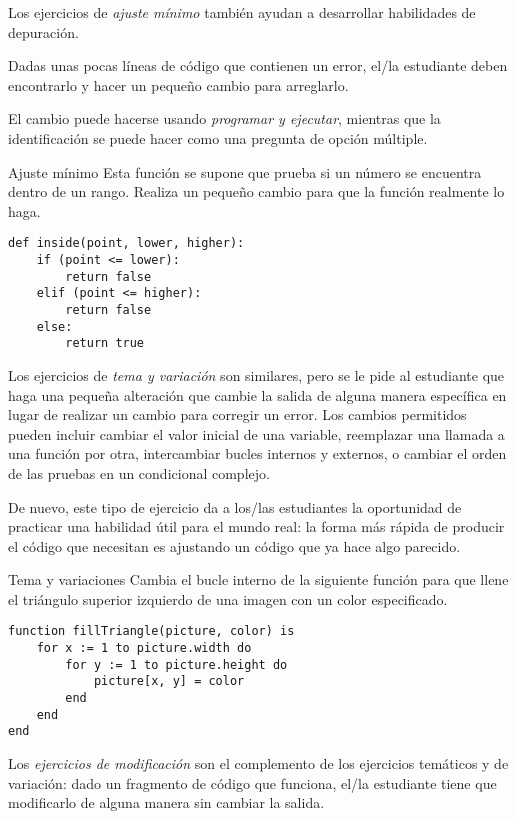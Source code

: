 Los ejercicios de \emph{ajuste mínimo} también ayudan a desarrollar habilidades de depuración.

Dadas unas pocas líneas de código que contienen un error, el/la estudiante deben encontrarlo y hacer un pequeño cambio para arreglarlo.

El cambio puede hacerse usando \emph{programar y ejecutar},
mientras que la identificación se puede hacer como una pregunta de opción múltiple.


\begin{aside}{Ajuste mínimo}
 Esta función se supone que prueba 
 si un número se encuentra dentro de un rango.
 Realiza un pequeño cambio para que la función realmente lo haga.

\begin{verbatim}
def inside(point, lower, higher):
    if (point <= lower):
        return false
    elif (point <= higher):
        return false
    else:
        return true
\end{verbatim}
\end{aside}

Los ejercicios de \emph{tema y variación} son similares, 
pero se le pide al estudiante que haga una pequeña alteración que cambie la salida de alguna manera específica 
en lugar de realizar un cambio para corregir un error.
Los cambios permitidos pueden incluir cambiar el valor inicial de una variable, 
reemplazar una llamada a una función por otra, 
intercambiar bucles internos y externos,
o cambiar el orden de las pruebas en un condicional complejo.

De nuevo,
este tipo de ejercicio da a los/las estudiantes la oportunidad de practicar una habilidad útil para el mundo real:
la forma más rápida de producir el código que necesitan 
es ajustando un código que ya hace algo parecido.

\begin{aside}{Tema y variaciones}
  Cambia el bucle interno de la siguiente 
  función para que llene el triángulo superior izquierdo de una imagen
  con un color especificado.

\begin{verbatim}
function fillTriangle(picture, color) is
    for x := 1 to picture.width do
        for y := 1 to picture.height do
            picture[x, y] = color
        end
    end
end
\end{verbatim}
\end{aside}

Los \emph{ejercicios de modificación} son el complemento de los ejercicios temáticos y de variación: 
dado un fragmento de código que funciona, el/la estudiante tiene que modificarlo de alguna manera sin cambiar la salida.

